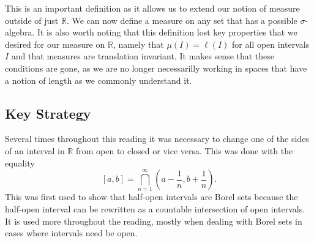\documentclass[12pt]{article}
\begin{document}
This is an important definition as it allows us to extend our notion of measure outside of just $\mathbb{R}$. We can now define a measure on any set that has a possible $\sigma$-algebra. It is also worth noting that this definition lost key properties that we desired for our measure on $\mathbb{R}$, namely that $\mu (I) = \ell (I)$ for all open intervals $I$ and that measures are translation invariant. It makes sense that these conditions are gone, as we are no longer necessarilly working in spaces that have a notion of length as we commonly understand it.

\subsection*{Key Strategy}

Several times throughout this reading it was necessary to change one of the sides of an interval in $\mathbb{R}$ from open to closed or vice versa. This was done with the equality $$[a, b] = \bigcap_{n=1}^\infty (a - \frac{1}{n}, b + \frac{1}{n}).$$ This was first used to show that half-open intervals are Borel sets because the half-open interval can be rewritten as a countable intersection of open intervals. It is used more throughout the reading, mostly when dealing with Borel sets in cases where intervals need be open.
\end{document}
